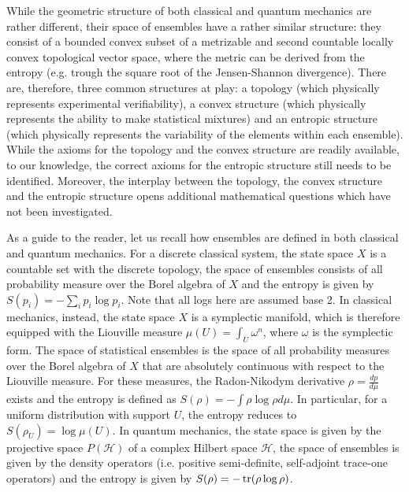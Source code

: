 While the geometric structure of both classical and quantum mechanics are rather different, their space of ensembles have a rather similar structure: they consist of a bounded convex subset of a metrizable and second countable locally convex topological vector space, where the metric can be derived from the entropy (e.g. trough the square root of the Jensen-Shannon divergence). There are, therefore, three common structures at play: a topology (which physically represents experimental verifiability), a convex structure (which physically represents the ability to make statistical mixtures) and an entropic structure (which physically represents the variability of the elements within each ensemble). While the axioms for the topology and the convex structure are readily available, to our knowledge, the correct axioms for the entropic structure still needs to be identified. Moreover, the interplay between the topology, the convex structure and the entropic structure opens additional mathematical questions which have not been investigated.

As a guide to the reader, let us recall how ensembles are defined in both classical and quantum mechanics. For a discrete classical system, the state space $X$ is a countable set with the discrete topology, the space of ensembles consists of all probability measure over the Borel algebra of $X$ and the entropy is given by $S(p_i) = - \sum_i p_i \log p_i$. Note that all logs here are assumed base 2. In classical mechanics, instead, the state space $X$ is a symplectic manifold, which is therefore equipped with the  Liouville measure $\mu(U) = \int_U \omega^n$, where $\omega$ is the symplectic form. The space of statistical ensembles is the space of all probability measures over the Borel algebra of $X$ that are absolutely continuous with respect to the Liouville measure. For these measures, the Radon-Nikodym derivative $\rho = \frac{dp}{d\mu}$ exists and the entropy is defined as $S(\rho) = - \int \rho \log \rho d\mu$. In particular, for a uniform distribution with support $U$, the entropy reduces to $S(\rho_U) = \log \mu(U)$. In quantum mechanics, the state space is given by the projective space $P(\mathcal{H})$ of a complex Hilbert space $\mathcal{H}$, the space of ensembles is given by the density operators (i.e. positive semi-definite, self-adjoint trace-one operators) and the entropy is given by $S(\rho) = -\operatorname{tr}(\rho \log \rho)$.

